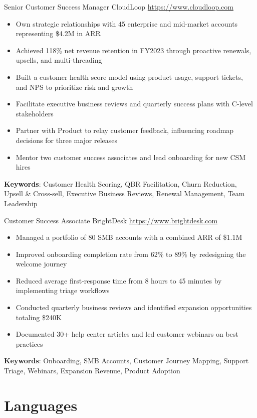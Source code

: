 \documentclass[a4paper, serif, 10pt]{moderncv}
\begin{document}
        {Senior Customer Success Manager}
        {CloudLoop}
        {\url{https://www.cloudloop.com}}
        {}
        {\begin{itemize}
\item Own strategic relationships with 45 enterprise and mid-market accounts representing \$4.2M in ARR
\item Achieved 118\% net revenue retention in FY2023 through proactive renewals, upsells, and multi-threading
\item Built a customer health score model using product usage, support tickets, and NPS to prioritize risk and growth
\item Facilitate executive business reviews and quarterly success plans with C-level stakeholders
\item Partner with Product to relay customer feedback, influencing roadmap decisions for three major releases
\item Mentor two customer success associates and lead onboarding for new CSM hires
\end{itemize}
\textbf{Keywords}: Customer Health Scoring, QBR Facilitation, Churn Reduction, Upsell \& Cross-sell, Executive Business Reviews, Renewal Management, Team Leadership}

        {Customer Success Associate}
        {BrightDesk}
        {\url{https://www.brightdesk.com}}
        {}
        {\begin{itemize}
\item Managed a portfolio of 80 SMB accounts with a combined ARR of \$1.1M
\item Improved onboarding completion rate from 62\% to 89\% by redesigning the welcome journey
\item Reduced average first-response time from 8 hours to 45 minutes by implementing triage workflows
\item Conducted quarterly business reviews and identified expansion opportunities totaling \$240K
\item Documented 30+ help center articles and led customer webinars on best practices
\end{itemize}
\textbf{Keywords}: Onboarding, SMB Accounts, Customer Journey Mapping, Support Triage, Webinars, Expansion Revenue, Product Adoption}
\section{Languages}
\end{document}
